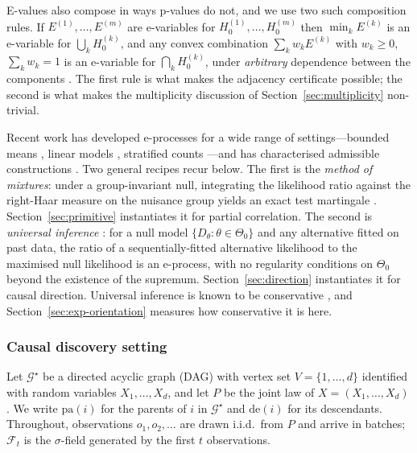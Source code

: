 \documentclass[pdflatex,sn-apa]{sn-jnl}
\theoremstyle{thmstyleone}%
\theoremstyle{thmstyletwo}%
\theoremstyle{thmstylethree}%
\newcommand{\Fcal}{\mathcal{F}}
\newcommand{\Gstar}{\mathcal{G}^{\star}}
\newcommand{\pa}{\mathrm{pa}}
\newcommand{\de}{\mathrm{de}}
\begin{document}
E-values also compose in ways p-values do not, and we use two such
composition rules. If $E^{(1)}, \dots, E^{(m)}$ are e-variables for
$H_0^{(1)}, \dots, H_0^{(m)}$ then $\min_k E^{(k)}$ is an e-variable for
$\bigcup_k H_0^{(k)}$, and any convex combination $\sum_k w_k E^{(k)}$ with
$w_k \ge 0$, $\sum_k w_k = 1$ is an e-variable for $\bigcap_k H_0^{(k)}$,
under \emph{arbitrary} dependence between the components
\citep{vovk2021evalues}. The first rule is what makes the adjacency
certificate possible; the second is what makes the multiplicity discussion of
Section~\ref{sec:multiplicity} non-trivial.

Recent work has developed e-processes for a wide range of settings---bounded
means \citep{waudbysmith2024estimating}, linear models
\citep{lindon2026anytime}, stratified counts \citep{turner2023safe}---and has
characterised admissible constructions \citep{ramdas2023gametheoretic}. Two
general recipes recur below. The first is the \emph{method of mixtures}: under
a group-invariant null, integrating the likelihood ratio against the right-Haar
measure on the nuisance group yields an exact test martingale
\citep{berger1998bayes,hendriksen2021optional,grunwald2024safe}.
Section~\ref{sec:primitive} instantiates it for partial correlation. The second
is \emph{universal inference} \citep{wasserman2020universal}: for a null model
$\{D_\theta : \theta \in \Theta_0\}$ and any alternative fitted on past data,
the ratio of a sequentially-fitted alternative likelihood to the maximised null
likelihood is an e-process, with no regularity conditions on $\Theta_0$ beyond
the existence of the supremum. Section~\ref{sec:direction} instantiates it for
causal direction. Universal inference is known to be conservative
\citep{tse2022note}, and Section~\ref{sec:exp-orientation} measures how
conservative it is here.

\subsubsection{Causal discovery setting}\label{sec:setting}

Let $\Gstar$ be a directed acyclic graph (DAG) with vertex set
$V = \{1,\dots,d\}$ identified with random variables $X_1,\dots,X_d$, and let
$P$ be the joint law of $X = (X_1,\dots,X_d)$. We write $\pa(i)$ for the
parents of $i$ in $\Gstar$ and $\de(i)$ for its descendants. Throughout,
observations $o_1, o_2, \dots$ are drawn i.i.d.\ from $P$ and arrive in
batches; $\Fcal_t$ is the $\sigma$-field generated by the first $t$
observations.
\end{document}
